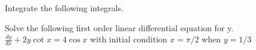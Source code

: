 \documentclass[english,11pt]{exam}
\newcommand{\dsp}{\displaystyle}
\newcommand{\ds}{\displaystyle}
\newcommand{\vs}[1]{\vspace{#1in}}
\newcommand{\hs}[1]{\hspace{#1in}}
\begin{document}
\begin{questions}
\question
Integrate the following integrals. 


\question [5]  Solve the following first order linear differential equation for y.\\ 
$\dsp \frac{dy}{dx}+2y\cot x=4\cos x$  \hs{.75} with initial condition $\dsp x=\pi/2$ when $\dsp y=1/3$ 
\vs{.1}


\end{questions}
\end{document}
